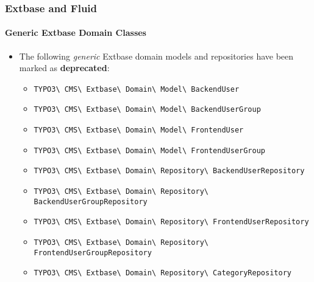 %

\begin{frame}[fragile]
	\frametitle{Extbase and Fluid}
	\framesubtitle{Generic Extbase Domain Classes}


	\begin{itemize}
		\item The following \textit{generic} Extbase domain models and repositories
			have been marked as \textbf{deprecated}:
			\vspace{0.1cm}
			\begin{itemize}\smaller
				\item \texttt{TYPO3\textbackslash
					CMS\textbackslash
					Extbase\textbackslash
					Domain\textbackslash
					Model\textbackslash
					BackendUser}
				\item \texttt{TYPO3\textbackslash
					CMS\textbackslash
					Extbase\textbackslash
					Domain\textbackslash
					Model\textbackslash
					BackendUserGroup}
				\item \texttt{TYPO3\textbackslash
					CMS\textbackslash
					Extbase\textbackslash
					Domain\textbackslash
					Model\textbackslash
					FrontendUser}
				\item \texttt{TYPO3\textbackslash
					CMS\textbackslash
					Extbase\textbackslash
					Domain\textbackslash
					Model\textbackslash
					FrontendUserGroup}
			\end{itemize}\normalsize
			\vspace{0.1cm}
			\begin{itemize}\smaller
				\item \texttt{TYPO3\textbackslash
					CMS\textbackslash
					Extbase\textbackslash
					Domain\textbackslash
					Repository\textbackslash
					BackendUserRepository}
				\item \texttt{TYPO3\textbackslash
					CMS\textbackslash
					Extbase\textbackslash
					Domain\textbackslash
					Repository\textbackslash
					BackendUserGroupRepository}
				\item \texttt{TYPO3\textbackslash
					CMS\textbackslash
					Extbase\textbackslash
					Domain\textbackslash
					Repository\textbackslash
					FrontendUserRepository}
				\item \texttt{TYPO3\textbackslash
					CMS\textbackslash
					Extbase\textbackslash
					Domain\textbackslash
					Repository\textbackslash
					FrontendUserGroupRepository}
				\item \texttt{TYPO3\textbackslash
					CMS\textbackslash
					Extbase\textbackslash
					Domain\textbackslash
					Repository\textbackslash
					CategoryRepository}
			\end{itemize}\normalsize


\end{itemize}
\end{frame}
